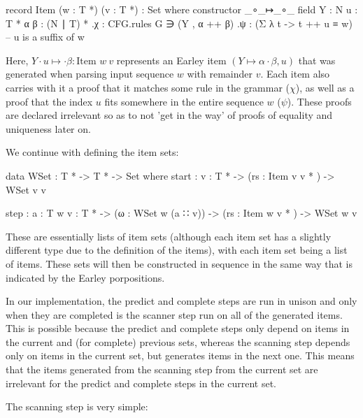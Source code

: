 		\begin{code}

			record Item (w : T *) (v : T *) : Set where
			  constructor _∘_↦_∘_
			  field
			    Y : N
			    u : T *
			    α β : (N ∣ T) *
			    .{χ} : CFG.rules G ∋ (Y , α ++ β)
			    .{ψ} : (Σ λ t -> t ++ u ≡ w)        -- u is a suffix of w
	
		\end{code}
		
		Here, $Y \cdot u \mapsto \cdot \beta : \textrm{Item } w\ v$ represents
		an Earley item $(Y \mapsto \alpha \cdot \beta , u)$ that was generated
		when parsing input sequence $w$ with remainder $v$. Each item also 
		carries with it a proof that it matches some rule in the grammar 
		($\chi$), as well as a proof that the index $u$ fits somewhere in the 
		entire sequence $w$ ($\psi$). These proofs are declared irrelevant so 
		as to not 'get in the way' of proofs of equality and uniqueness later 
		on.

		We continue with defining the item sets:
	
		\begin{code}
	
			data WSet : T * -> T * -> Set where
			  start : {v : T *} ->
			    (rs : Item v v * ) ->
			    WSet v v
			
			  step : {a : T} {w v : T *} ->
			    (ω : WSet w (a ∷ v)) ->
			    (rs : Item w v * ) ->
			    WSet w v
	
		\end{code}
		
		These are essentially lists of item sets (although each item set has a 
		slightly different type due to the definition of the items), with each 
		item set being a list of items. These sets will then be constructed in 
		sequence in the same way that is indicated by the Earley porpositions.
		
		In our implementation, the predict and complete steps are run in unison
		and only when they are completed is the scanner step run on all of the 
		generated items. This is possible because the predict and complete 
		steps only depend on items in the current and (for complete) previous 
		sets, whereas the scanning step depends only on items in the current 
		set, but generates items in the next one. This means that the items 
		generated from the scanning step from the current set are irrelevant 
		for the predict and complete steps in the current set.

		The scanning step is very simple:
		
